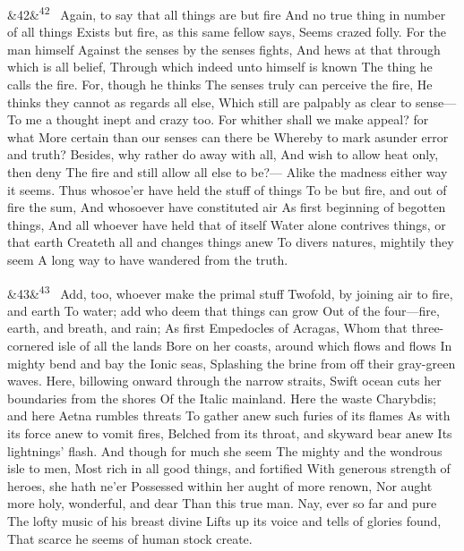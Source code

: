 \documentclass[12pt]{article}
\newcommand{\para}[1][]{\par\noindent\ifx&#1&\else\textsuperscript{\footnotesize #1}~\fi}
\begin{document}
\para[42] Again, to say that all things are but fire And no true thing in number of all things Exists but fire, as this same fellow says, Seems crazed folly. For the man himself Against the senses by the senses fights, And hews at that through which is all belief, Through which indeed unto himself is known The thing he calls the fire. For, though he thinks The senses truly can perceive the fire, He thinks they cannot as regards all else, Which still are palpably as clear to sense--- To me a thought inept and crazy too. For whither shall we make appeal? for what More certain than our senses can there be Whereby to mark asunder error and truth? Besides, why rather do away with all, And wish to allow heat only, then deny The fire and still allow all else to be?--- Alike the madness either way it seems. Thus whosoe'er have held the stuff of things To be but fire, and out of fire the sum, And whosoever have constituted air As first beginning of begotten things, And all whoever have held that of itself Water alone contrives things, or that earth Createth all and changes things anew To divers natures, mightily they seem A long way to have wandered from the truth.

\para[43] Add, too, whoever make the primal stuff Twofold, by joining air to fire, and earth To water; add who deem that things can grow Out of the four---fire, earth, and breath, and rain; As first Empedocles of Acragas, Whom that three-cornered isle of all the lands Bore on her coasts, around which flows and flows In mighty bend and bay the Ionic seas, Splashing the brine from off their gray-green waves. Here, billowing onward through the narrow straits, Swift ocean cuts her boundaries from the shores Of the Italic mainland. Here the waste Charybdis; and here Aetna rumbles threats To gather anew such furies of its flames As with its force anew to vomit fires, Belched from its throat, and skyward bear anew Its lightnings' flash. And though for much she seem The mighty and the wondrous isle to men, Most rich in all good things, and fortified With generous strength of heroes, she hath ne'er Possessed within her aught of more renown, Nor aught more holy, wonderful, and dear Than this true man. Nay, ever so far and pure The lofty music of his breast divine Lifts up its voice and tells of glories found, That scarce he seems of human stock create.
\end{document}
